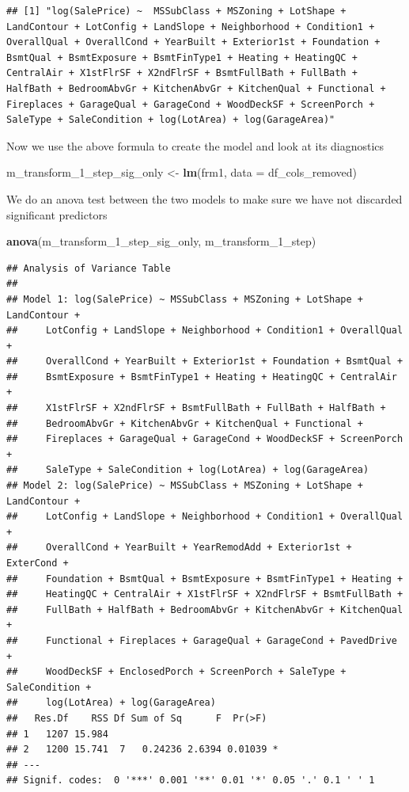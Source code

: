 \documentclass[
]{article}
\newenvironment{Shaded}{\begin{snugshade}}{\end{snugshade}}
\newcommand{\DataTypeTok}[1]{\textcolor[rgb]{0.13,0.29,0.53}{#1}}
\newcommand{\DecValTok}[1]{\textcolor[rgb]{0.00,0.00,0.81}{#1}}
\newcommand{\KeywordTok}[1]{\textcolor[rgb]{0.13,0.29,0.53}{\textbf{#1}}}
\newcommand{\NormalTok}[1]{#1}
\newcommand{\StringTok}[1]{\textcolor[rgb]{0.31,0.60,0.02}{#1}}
\begin{document}
\begin{verbatim}
## [1] "log(SalePrice) ~  MSSubClass + MSZoning + LotShape + LandContour + LotConfig + LandSlope + Neighborhood + Condition1 + OverallQual + OverallCond + YearBuilt + Exterior1st + Foundation + BsmtQual + BsmtExposure + BsmtFinType1 + Heating + HeatingQC + CentralAir + X1stFlrSF + X2ndFlrSF + BsmtFullBath + FullBath + HalfBath + BedroomAbvGr + KitchenAbvGr + KitchenQual + Functional + Fireplaces + GarageQual + GarageCond + WoodDeckSF + ScreenPorch + SaleType + SaleCondition + log(LotArea) + log(GarageArea)"
\end{verbatim}

Now we use the above formula to create the model and look at its diagnostics

\begin{Shaded}
\begin{Highlighting}[]
\NormalTok{m_transform_}\DecValTok{1}\NormalTok{_step_sig_only <-}\StringTok{ }\KeywordTok{lm}\NormalTok{(frm1, }\DataTypeTok{data =}\NormalTok{ df_cols_removed)}
\end{Highlighting}
\end{Shaded}

We do an anova test between the two models to make sure we have not discarded significant predictors

\begin{Shaded}
\begin{Highlighting}[]
\KeywordTok{anova}\NormalTok{(m_transform_}\DecValTok{1}\NormalTok{_step_sig_only, m_transform_}\DecValTok{1}\NormalTok{_step)}
\end{Highlighting}
\end{Shaded}

\begin{verbatim}
## Analysis of Variance Table
## 
## Model 1: log(SalePrice) ~ MSSubClass + MSZoning + LotShape + LandContour + 
##     LotConfig + LandSlope + Neighborhood + Condition1 + OverallQual + 
##     OverallCond + YearBuilt + Exterior1st + Foundation + BsmtQual + 
##     BsmtExposure + BsmtFinType1 + Heating + HeatingQC + CentralAir + 
##     X1stFlrSF + X2ndFlrSF + BsmtFullBath + FullBath + HalfBath + 
##     BedroomAbvGr + KitchenAbvGr + KitchenQual + Functional + 
##     Fireplaces + GarageQual + GarageCond + WoodDeckSF + ScreenPorch + 
##     SaleType + SaleCondition + log(LotArea) + log(GarageArea)
## Model 2: log(SalePrice) ~ MSSubClass + MSZoning + LotShape + LandContour + 
##     LotConfig + LandSlope + Neighborhood + Condition1 + OverallQual + 
##     OverallCond + YearBuilt + YearRemodAdd + Exterior1st + ExterCond + 
##     Foundation + BsmtQual + BsmtExposure + BsmtFinType1 + Heating + 
##     HeatingQC + CentralAir + X1stFlrSF + X2ndFlrSF + BsmtFullBath + 
##     FullBath + HalfBath + BedroomAbvGr + KitchenAbvGr + KitchenQual + 
##     Functional + Fireplaces + GarageQual + GarageCond + PavedDrive + 
##     WoodDeckSF + EnclosedPorch + ScreenPorch + SaleType + SaleCondition + 
##     log(LotArea) + log(GarageArea)
##   Res.Df    RSS Df Sum of Sq      F  Pr(>F)  
## 1   1207 15.984                              
## 2   1200 15.741  7   0.24236 2.6394 0.01039 *
## ---
## Signif. codes:  0 '***' 0.001 '**' 0.01 '*' 0.05 '.' 0.1 ' ' 1
\end{verbatim}
\end{document}
